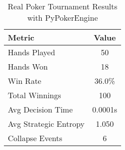 \begin{table}[h]
\centering
\caption{Real Poker Tournament Results with PyPokerEngine}
\begin{tabular}{|l|c|}
\hline
Metric & Value \\
\hline
Hands Played & 50 \\
Hands Won & 18 \\
Win Rate & 36.0\% \\
Total Winnings & 100 \\
Avg Decision Time & 0.0001s \\
Avg Strategic Entropy & 1.050 \\
Collapse Events & 6 \\
\hline
\end{tabular}
\end{table}